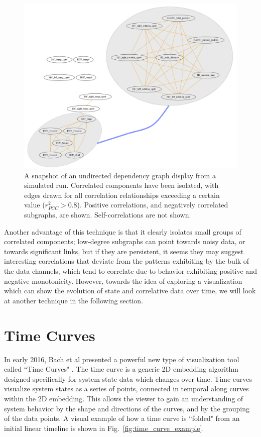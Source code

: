 \begin{figure}[h]
\centering
    \includegraphics[width=\columnwidth]{images/undirected_positive_with_negative_clusters.png}
    \caption{A snapshot of an undirected dependency graph display from a simulated run. Correlated components have been isolated, with edges drawn for all correlation relationships exceeding a certain value ($r_{PCC}^{2} > 0.8$). Positive correlations, and negatively correlated subgraphs, are shown. Self-correlations are not shown.}
    \label{fig:undirected_positive_with_negative_clusters}
\end{figure}

Another advantage of this technique is that it clearly isolates small groups of correlated components; low-degree subgraphs can point towards noisy data, or towards significant links, but if they are persistent, it seems they may suggest interesting correlations that deviate from the patterns exhibiting by the bulk of the data channels, which tend to correlate due to behavior exhibiting positive and negative monotonicity. However, towards the idea of exploring a visualization which can show the evolution of state and correlative data over time, we will look at another technique in the following section.

\section{Time Curves}

In early 2016, Bach et al presented a powerful new type of visualization tool called ``Time Curves" \cite{bach2016time}. The time curve is a generic 2D embedding algorithm designed specifically for system state data which changes over time. Time curves visualize system states as a series of points, connected in temporal along curves within the 2D embedding. This allows the viewer to gain an understanding of system behavior by the shape and directions of the curves, and by the grouping of the data points. A visual example of how a time curve is ``folded" from an initial linear timeline is shown in Fig.~\ref{fig:time_curve_example}.

